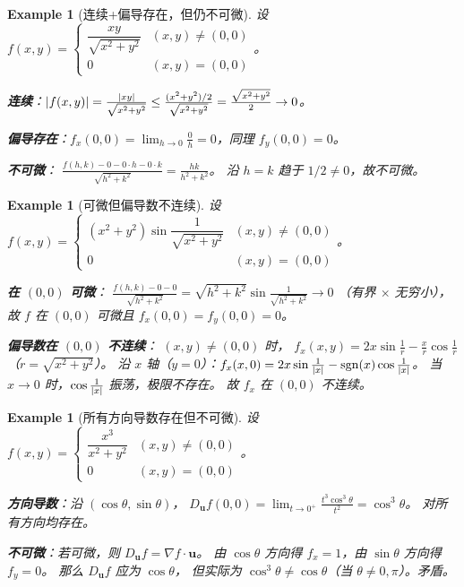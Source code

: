 \documentclass{ctexart}
\newtheorem{example}[theorem]{Example}
\begin{document}
\begin{example}[连续+偏导存在，但仍不可微]
  \label{ex:cont-pde-not-diff}
  设
  $f(x,y) = \begin{cases} \dfrac{xy}{\sqrt{x^2+y^2}} & (x,y) \ne (0,0) \\ 0 & (x,y) = (0,0) \end{cases}$。

  \textbf{连续}：$\left| f(x,y) \right| = \frac{\left| xy \right|}{\sqrt{x^2+y^2}}
  \le \frac{(x^2+y^2)/2}{\sqrt{x^2+y^2}} = \frac{\sqrt{x^2+y^2}}{2} \to 0$。

  \textbf{偏导存在}：$f_x(0,0) = \lim_{h \to 0}\frac{0}{h} = 0$，同理 $f_y(0,0) = 0$。

  \textbf{不可微}：
  $\frac{f(h,k) - 0 - 0 \cdot h - 0 \cdot k}{\sqrt{h^2+k^2}}
  = \frac{hk}{h^2+k^2}$。
  沿 $h = k$ 趋于 $1/2 \ne 0$，故不可微。
\end{example}

\begin{example}[可微但偏导数不连续]
  \label{ex:diff-not-C1}
  设
  $f(x,y) = \begin{cases} (x^2+y^2)\sin\dfrac{1}{\sqrt{x^2+y^2}} & (x,y) \ne (0,0) \\
    0 & (x,y) = (0,0) \end{cases}$。

  \textbf{在 $(0,0)$ 可微}：
  $\frac{f(h,k) - 0 - 0}{\sqrt{h^2+k^2}}
  = \sqrt{h^2+k^2}\sin\frac{1}{\sqrt{h^2+k^2}} \to 0$
  （有界 $\times$ 无穷小），故 $f$ 在 $(0,0)$ 可微且 $f_x(0,0) = f_y(0,0) = 0$。

  \textbf{偏导数在 $(0,0)$ 不连续}：
  $(x,y) \ne (0,0)$ 时，
  $f_x(x,y) = 2x\sin\frac{1}{r} - \frac{x}{r}\cos\frac{1}{r}$
  （$r = \sqrt{x^2+y^2}$）。
  沿 $x$ 轴（$y=0$）：$f_x(x,0) = 2x\sin\frac{1}{\left| x \right|} - \mathrm{sgn}(x)\cos\frac{1}{\left| x \right|}$。
  当 $x \to 0$ 时，$\cos\frac{1}{\left| x \right|}$ 振荡，极限不存在。
  故 $f_x$ 在 $(0,0)$ 不连续。
\end{example}

\begin{example}[所有方向导数存在但不可微]
  \label{ex:dir-not-diff}
  设
  $f(x,y) = \begin{cases} \dfrac{x^3}{x^2+y^2} & (x,y) \ne (0,0) \\ 0 & (x,y) = (0,0) \end{cases}$。

  \textbf{方向导数}：沿 $(\cos\theta, \sin\theta)$，
  $D_{\mathbf{u}}f(0,0) = \lim_{t \to 0^+}\frac{t^3\cos^3\theta}{t^2} = \cos^3\theta$。
  对所有方向均存在。

  \textbf{不可微}：若可微，则 $D_{\mathbf{u}}f = \nabla f \cdot \mathbf{u}$。
  由 $\cos\theta$ 方向得 $f_x = 1$，由 $\sin\theta$ 方向得 $f_y = 0$。
  那么 $D_{\mathbf{u}}f$ 应为 $\cos\theta$，
  但实际为 $\cos^3\theta \ne \cos\theta$（当 $\theta \ne 0,\pi$）。矛盾。
\end{example}
\end{document}
